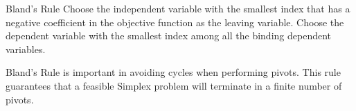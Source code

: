 \begin{definition}{Bland's Rule}
Choose the independent variable with the smallest index that has a negative coefficient in the objective function
as the leaving variable.
Choose the dependent variable with the smallest index among all the binding dependent variables.
\end{definition}

Bland's Rule is important in avoiding cycles when performing pivots.
This rule guarantees that a feasible Simplex problem will terminate in a finite number of pivots.%


